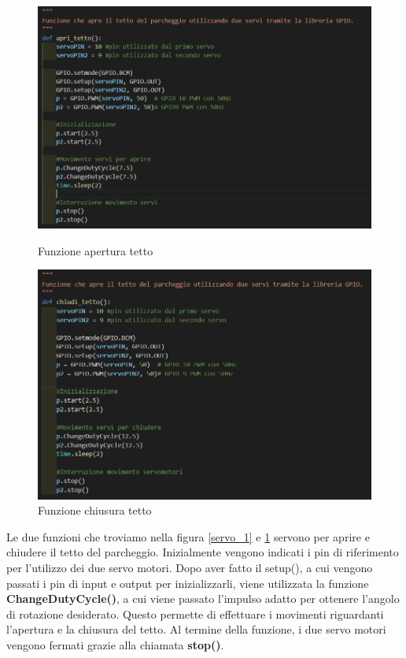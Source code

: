 \documentclass[a4paper,11pt]{report}
\begin{document}
\begin{figure}[H]
	\centering
	\begin{minipage}[b]{.5\textwidth}
		\includegraphics[width=\textwidth]{servo_1}
		\caption{Funzione apertura tetto}
		\label{servo_1}
	\end{minipage}
	\begin{minipage}[b]{.485\textwidth}
	\includegraphics[width=\textwidth]{servo_2}
	\caption{Funzione chiusura tetto}
	\label{servo_2}
	\end{minipage}
\end{figure}

Le due funzioni che troviamo nella figura \ref{servo_1} e \ref{servo_2} servono per aprire e chiudere il tetto del parcheggio.
Inizialmente vengono indicati i pin di riferimento per l’utilizzo dei due servo motori. Dopo aver fatto il setup(), a cui vengono passati i pin di input e output per inizializzarli, viene utilizzata la funzione \textbf{ChangeDutyCycle()}, a cui viene passato l'impulso adatto per ottenere l'angolo di rotazione desiderato. Questo permette di effettuare i movimenti riguardanti l’apertura e la chiusura del tetto. Al termine della funzione, i due servo motori vengono fermati grazie alla chiamata \textbf{stop()}.
\end{document}
